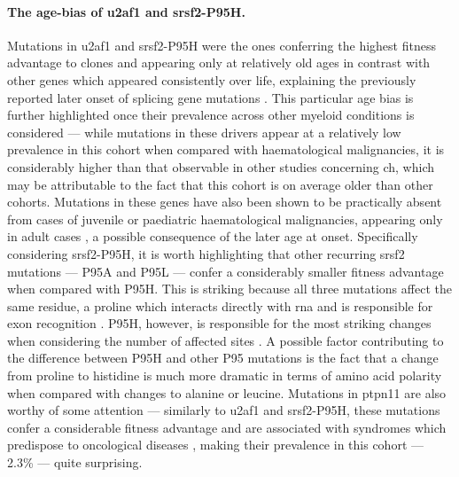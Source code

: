 \paragraph{The age-bias of \ac{u2af1} and \ac{srsf2}-P95H.} Mutations in \ac{u2af1} and \ac{srsf2}-P95H were the ones conferring the highest fitness advantage to clones and appearing only at relatively old ages in contrast with other genes which appeared consistently over life, explaining the previously reported later onset of splicing gene mutations \cite{McKerrell2015-rl}. This particular age bias is further highlighted once their prevalence across other myeloid conditions is considered  --- while mutations in these drivers appear at a relatively low prevalence in this cohort when compared with haematological malignancies, it is considerably higher than that observable in other studies concerning \ac{ch}, which may be attributable to the fact that this cohort is on average older than other cohorts. Mutations in these genes have also been shown to be practically absent from cases of juvenile or paediatric haematological malignancies, appearing only in adult cases \cite{Kar2013-nw,Takita2012-yo}, a possible consequence of the later age at onset. Specifically considering \ac{srsf2}-P95H, it is worth highlighting that other recurring \ac{srsf2} mutations --- P95A and P95L --- confer a considerably smaller fitness advantage when compared with P95H. This is striking because all three mutations affect the same residue, a proline which interacts directly with \ac{rna} and is responsible for exon recognition \cite{Daubner2012-zp,Kim2015-qz}. P95H, however, is responsible for the most striking changes when considering the number of affected sites \cite{Rahman2020-bh,Zhang2015-xu}. A possible factor contributing to the difference between P95H and other P95 mutations is the fact that a change from proline to histidine is much more dramatic in terms of amino acid polarity when compared with changes to alanine or leucine. Mutations in \ac{ptpn11} are also worthy of some attention --- similarly to \ac{u2af1} and \ac{srsf2}-P95H, these mutations confer a considerable fitness advantage and are associated with syndromes which predispose to oncological diseases \cite{Digilio2002-nq,Tartaglia2001-ru,Kratz2005-qh}, making their prevalence in this cohort --- 2.3\% --- quite surprising.

